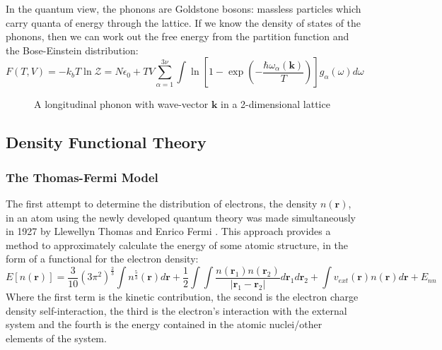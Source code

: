 \documentclass[12pt]{article}
\begin{document}
In the quantum view, the phonons are Goldstone bosons: massless particles which carry quanta of energy through the lattice. If we know the density of states of the phonons, then we can work out the free energy from the partition function \cite{yoshioka2007partition} and the Bose-Einstein distribution:
\begin{equation}
	F(T, V) = -k_bT\ln \mathcal Z = N\epsilon_0 + TV\sum_{\alpha=1}^{3\nu}\int \ln \left[ 1-\exp\left(-\frac{\hbar \omega_\alpha(\mathbf k)}{T}\right)\right]g_\alpha(\omega)d\omega
\end{equation}

\begin{figure}
\centering
{}
\caption{A longitudinal phonon with wave-vector $\mathbf k$ in a 2-dimensional lattice}
\label{fig:phonon:disturbance}
\end{figure}

\subsection{Density Functional Theory}
\subsubsection{The Thomas-Fermi Model}
The first attempt to determine the distribution of electrons, the density $n(\mathbf r)$, in an atom using the newly developed quantum theory was made simultaneously in 1927 by Llewellyn Thomas \cite{thomas_1927} and Enrico Fermi \cite{fermi1927metodo}. 
This approach provides a method to approximately calculate the energy of some atomic structure, in the form of a functional for the electron density:
\begin{equation}\label{eq:thomas-fermi}
	E[n(\mathbf r)] = \frac{3}{10}(3\pi^2)^{\frac{2}{3}}\int n^{\frac{5}{3}}(\mathbf r) d \mathbf r + \frac{1}{2}\int\int\frac{n(\mathbf r_1) n(\mathbf r_2)}{\left| \mathbf r_1 - \mathbf r_2\right|}d\mathbf r_1 d\mathbf r_2 + \int v_{ext}(\mathbf r) n(\mathbf r) d \mathbf r + E_{nn}
\end{equation}
Where the first term is the kinetic contribution, the second is the electron charge density self-interaction, the third is the electron's interaction with the external system and the fourth is the energy contained in the atomic nuclei/other elements of the system.
\end{document}
